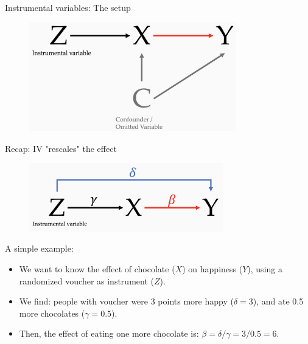 \documentclass[11pt,xcolor=table]{beamer}
\begin{document}
\begin{frame}{Instrumental variables: The setup}
    \begin{figure}
        \centering
        \includegraphics[width=0.8\textwidth]{DAGs/iv_simple.png}
        \label{fig:iv}
    \end{figure}
\end{frame}



\begin{frame}{Recap: IV "rescales" the effect}
    \begin{figure}
        \centering
        \includegraphics[width=0.75\textwidth]{DAGs/iv_calc.png}
        \label{fig:iv2}
    \end{figure}
    
    A simple example: 
    \begin{itemize}
    \item We want to know the effect of chocolate ($X$) on happiness ($Y$), using a randomized voucher as instrument ($Z$). 
    \item We find: people with voucher were 3 points more happy ($\delta = 3$), and ate  0.5 more chocolates ($\gamma=0.5$).
    \item Then, the effect of eating one more chocolate is: \pause  $\beta = \delta / \gamma = 3/0.5= 6$.
    \end{itemize}
\end{frame}
\end{document}
